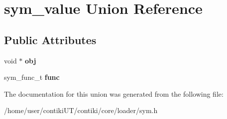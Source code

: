 \hypertarget{unionsym__value}{}\section{sym\+\_\+value Union Reference}
\label{unionsym__value}
\subsection*{Public Attributes}
\begin{DoxyCompactItemize}
\item 
\hypertarget{unionsym__value_af3a7ccbc84dc8687eb56cb6aa85d0c8d}{}void $\ast$ {\bfseries obj}\label{unionsym__value_af3a7ccbc84dc8687eb56cb6aa85d0c8d}

\item 
\hypertarget{unionsym__value_adef17eb172830d95286a7b3f7ac097d4}{}sym\+\_\+func\+\_\+t {\bfseries func}\label{unionsym__value_adef17eb172830d95286a7b3f7ac097d4}

\end{DoxyCompactItemize}


The documentation for this union was generated from the following file\+:\begin{DoxyCompactItemize}
\item 
/home/user/contiki\+U\+T/contiki/core/loader/sym.\+h\end{DoxyCompactItemize}
